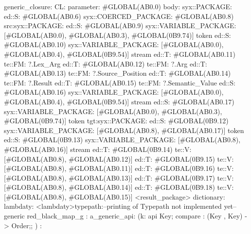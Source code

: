 generic_closure:
CL:
parameter: #GLOBAL(AB0.0)
body: syx::PACKAGE:
        ed::S: #GLOBAL(AB0.6)
            syx::COERCED_PACKAGE:
                #GLOBAL(AB0.8)
                 src:syx::PACKAGE:
                        ed::S: #GLOBAL(AB0.9) syx::VARIABLE_PACKAGE: [#GLOBAL(AB0.0), #GLOBAL(AB0.3), #GLOBAL(0B9.74)] token
                        ed::S: #GLOBAL(AB0.10) syx::VARIABLE_PACKAGE: [#GLOBAL(AB0.0), #GLOBAL(AB0.4), #GLOBAL(0B9.54)] stream
                        ed::T: #GLOBAL(AB0.11) te::FM: ?.Lex_Arg
                        ed::T: #GLOBAL(AB0.12) te::FM: ?.Arg
                        ed::T: #GLOBAL(AB0.13) te::FM: ?.Source_Position
                        ed::T: #GLOBAL(AB0.14) te::FM: ?.Result
                        ed::T: #GLOBAL(AB0.15) te::FM: ?.Semantic_Value
                    ed::S: #GLOBAL(AB0.16)
                     syx::VARIABLE_PACKAGE:
                     [#GLOBAL(AB0.0), #GLOBAL(AB0.4), #GLOBAL(0B9.54)]
                     stream
                    ed::S: #GLOBAL(AB0.17)
                     syx::VARIABLE_PACKAGE:
                     [#GLOBAL(AB0.0), #GLOBAL(AB0.3), #GLOBAL(0B9.74)]
                     token
                tgt:syx::PACKAGE:
                    ed::S: #GLOBAL(0B9.12)
                     syx::VARIABLE_PACKAGE:
                     [#GLOBAL(AB0.8), #GLOBAL(AB0.17)]
                     token
                    ed::S: #GLOBAL(0B9.13)
                     syx::VARIABLE_PACKAGE:
                     [#GLOBAL(AB0.8), #GLOBAL(AB0.16)]
                     stream
                    ed::T: #GLOBAL(0B9.14)
                     te::V:
                     [#GLOBAL(AB0.8), #GLOBAL(AB0.12)]
                    ed::T: #GLOBAL(0B9.15)
                     te::V:
                     [#GLOBAL(AB0.8), #GLOBAL(AB0.11)]
                    ed::T: #GLOBAL(0B9.16)
                     te::V:
                     [#GLOBAL(AB0.8), #GLOBAL(AB0.13)]
                    ed::T: #GLOBAL(0B9.17)
                     te::V:
                     [#GLOBAL(AB0.8), #GLOBAL(AB0.14)]
                    ed::T: #GLOBAL(0B9.18)
                     te::V:
                     [#GLOBAL(AB0.8), #GLOBAL(AB0.15)]
         <result_package>
dictionary:
lambdaty:
  <lambdaty>typepath:--printing of Typepath not implemented yet--
generic red_black_map_g
:
a_generic_api:
(k:
api {
    Key;
    compare : (Key , Key) -> Order;};
)
:
